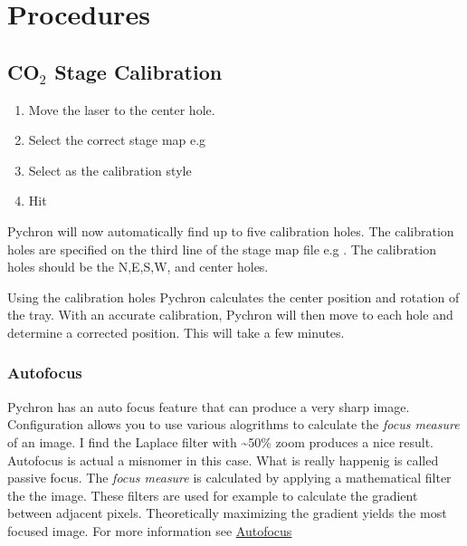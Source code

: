 \documentclass[letterpaper,10pt,english]{sphinxmanual}
\begin{document}
\chapter{Procedures}
\label{procedures:procedures}\label{procedures::doc}

\section{CO$_{\text{2}}$ Stage Calibration}
\label{calibration::doc}\label{calibration:co2-stage-calibration}\begin{enumerate}
\item {} 
Move the laser to the center hole.

\item {} 
Select the correct stage map e.g 

\item {} 
Select  as the calibration style

\item {} 
Hit 

\end{enumerate}

Pychron will now automatically find up to five calibration holes. The calibration holes are
specified on the third line of the stage map file e.g . The calibration holes
should be the N,E,S,W, and center holes.

Using the calibration holes Pychron calculates the center position and rotation of the tray.
With an accurate calibration, Pychron will then move to each hole and determine a corrected position.
This will take a few minutes.


\subsection{Autofocus}
\label{calibration:autofocus}
Pychron has an auto focus feature that can produce a very sharp image.
Configuration allows you to use various alogrithms to calculate the \emph{focus measure}
of an image. I find the Laplace filter with \textasciitilde{}50\% zoom produces a nice result.
Autofocus is actual a misnomer in this case. What is really happenig is called passive focus.
The \emph{focus measure} is calculated by applying a mathematical filter the the image. These filters
are used for example to calculate the gradient between adjacent pixels. Theoretically maximizing
the gradient yields the most focused image. For more information see
\href{http://en.wikipedia.org/wiki/Autofocus}{Autofocus}
\end{document}
